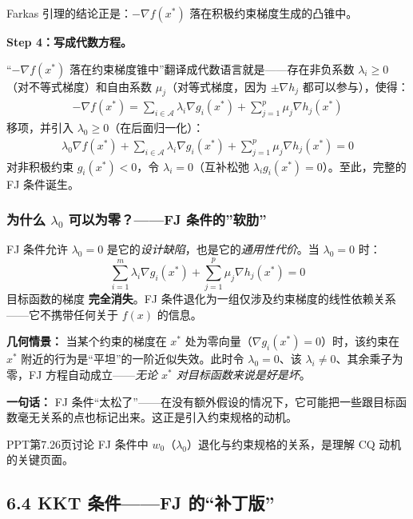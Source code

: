 Farkas 引理的结论正是：$-\nabla f(x^*)$ 落在积极约束梯度生成的凸锥中。

\smallskip
\textbf{Step 4：写成代数方程。}

“$-\nabla f(x^*)$ 落在约束梯度锥中”翻译成代数语言就是——存在非负系数 $\lambda_i\ge0$（对不等式梯度）和自由系数 $\mu_j$（对等式梯度，因为 $\pm\nabla h_j$ 都可以参与），使得：
\begin{align*}
-\nabla f(x^*) = \sum_{i\in\mathcal{A}} \lambda_i \nabla g_i(x^*) + \sum_{j=1}^p \mu_j \nabla h_j(x^*)
\end{align*}
移项，并引入 $\lambda_0\ge0$（在后面归一化）：
\begin{align*}
\lambda_0 \nabla f(x^*) + \sum_{i\in\mathcal{A}} \lambda_i \nabla g_i(x^*) + \sum_{j=1}^p \mu_j \nabla h_j(x^*) = 0
\end{align*}
对非积极约束 $g_i(x^*)<0$，令 $\lambda_i=0$（互补松弛 $\lambda_i g_i(x^*)=0$）。至此，完整的 FJ 条件诞生。

\medskip

\subsubsection{为什么 $\lambda_0$ 可以为零？——FJ 条件的”软肋”}

FJ 条件允许 $\lambda_0 = 0$ 是它的\emph{设计缺陷}，也是它的\emph{通用性代价}。当 $\lambda_0=0$ 时：
\[
\sum_{i=1}^m \lambda_i \nabla g_i(x^*) + \sum_{j=1}^p \mu_j \nabla h_j(x^*) = 0
\]
目标函数的梯度 \textbf{完全消失}。FJ 条件退化为一组仅涉及约束梯度的线性依赖关系——它不携带任何关于 $f(x)$ 的信息。

\textbf{几何情景：} 当某个约束的梯度在 $x^*$ 处为零向量（$\nabla g_i(x^*)=0$）时，该约束在 $x^*$ 附近的行为是“平坦”的一阶近似失效。此时令 $\lambda_0=0$、该 $\lambda_i\neq 0$、其余乘子为零，FJ 方程自动成立——\emph{无论 $x^*$ 对目标函数来说是好是坏}。

\begin{notebox}
\textbf{一句话：} FJ 条件“太松了”——在没有额外假设的情况下，它可能把一些跟目标函数毫无关系的点也标记出来。这正是引入约束规格的动机。
\end{notebox}

\medskip
PPT第7.26页讨论 FJ 条件中 $w_0$（$\lambda_0$）退化与约束规格的关系，是理解 CQ
动机的关键页面。
\medskip
{}
\medskip

\subsection{6.4 KKT 条件——FJ 的“补丁版”}

